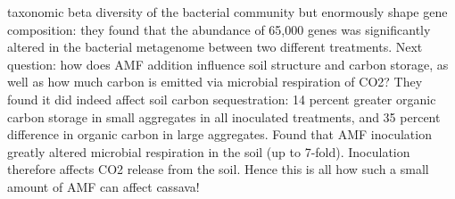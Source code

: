 \documentclass[9pt]{article}
\begin{document}
taxonomic beta diversity of the bacterial community but enormously shape gene composition: they found that the abundance of 65,000 genes was significantly altered in the bacterial metagenome between two different treatments. Next question: how does AMF addition influence soil structure and carbon storage, as well as how much carbon is emitted via microbial respiration of CO2? They found it did indeed affect soil carbon sequestration: 14 percent greater organic carbon storage in small aggregates in all inoculated treatments, and 35 percent difference in organic carbon in large aggregates. Found that AMF inoculation greatly altered microbial respiration in the soil (up to 7-fold). Inoculation therefore affects CO2 release from the soil. Hence this is all how such a small amount of AMF can affect cassava!
	
	 
	
	
	
	



	
	
	
	
	
	
	
\end{document}
